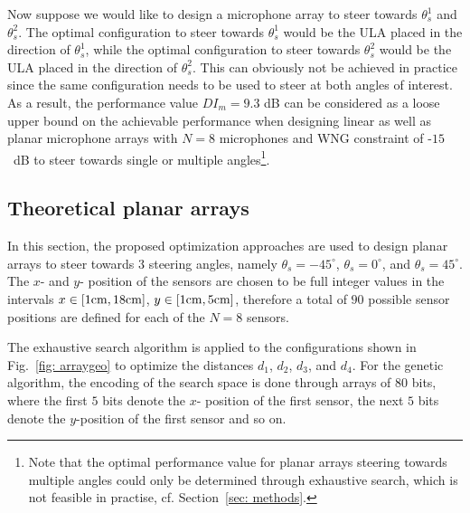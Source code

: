\documentclass[9pt]{article}
\begin{document}
Now suppose we would like to design a microphone array to steer towards $\theta_{s}^{1}$ and $\theta_{s}^{2}$. The optimal configuration to steer towards $\theta_{s}^{1}$ would be the ULA placed in the direction of $\theta_{s}^1$, while the optimal configuration to steer towards $\theta_{s}^2$ would be the ULA placed in the direction of $\theta_{s}^{2}$. This can obviously not be achieved in practice since the same configuration needs to be used to steer at both angles of interest. As a result, the performance value $DI_{m} = 9.3$ dB can be considered as a loose upper bound on the achievable performance when designing linear as well as planar microphone arrays with $N=8$ microphones and WNG constraint of -$15$~dB to steer towards single or multiple angles\footnote{Note that the optimal performance value for planar arrays steering towards multiple angles could only be determined through exhaustive search, which is not feasible in practise, cf. Section~\ref{sec: methods}.}.

\vspace{-0.3cm}
\subsection{Theoretical planar arrays}
\label{sec: 2darray}
\vspace{-0.2cm}
In this section, the proposed optimization approaches are used to design planar arrays to steer towards $3$ steering angles, namely $\theta_{s} = -45^{\circ}$, $\theta_{s} = 0^{\circ}$, and $\theta_{s} = 45^{\circ}$. 
The $x$- and $y$- position of the sensors are chosen to be full integer values in the intervals $x \in [1 {\rm cm}, 18 {\rm cm}]$, $y \in [1 {\rm cm}, 5 {\rm cm}]$, therefore a total of $90$ possible sensor positions are defined for each of the $N=8$ sensors. 

The exhaustive search algorithm is applied to the configurations shown in Fig.~\ref{fig: arraygeo} to optimize the distances $d_1$, $d_2$, $d_3$, and $d_4$. For the genetic algorithm, the encoding of the search space is done through arrays of 80 bits, where the first $5$ bits denote the $x$- position of the first sensor, the next $5$ bits denote the $y$-position of the first sensor and so on.
 
\end{document}
